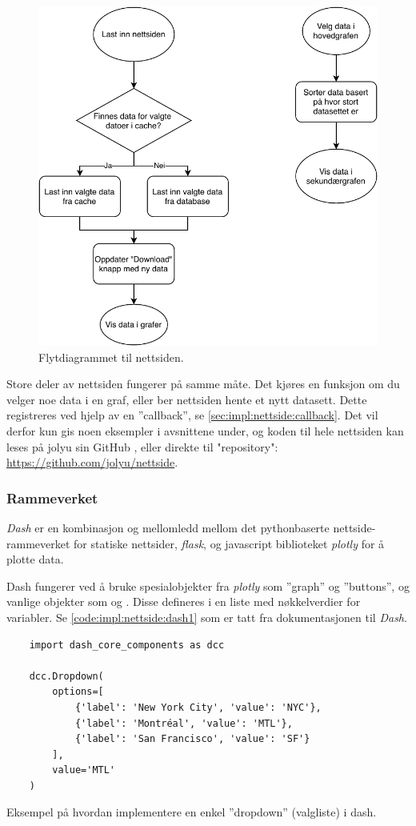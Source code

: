 \begin{figure}[!htbp]
    \centering
    \includegraphics[width=.7\textwidth]{implementering/nettside/JolyuNettsideOverordnetFlyt.pdf}
    \caption{Flytdiagrammet til nettsiden.}
    \label{fig:nettside:flytdiagram}
\end{figure}

Store deler av nettsiden fungerer på samme måte. 
Det kjøres en funksjon om du velger noe data i en graf, eller ber nettsiden hente et nytt datasett. 
Dette registreres ved hjelp av en ''callback'', se \autoref{sec:impl:nettside:callback}.
Det vil derfor kun gis noen eksempler i avsnittene under, og koden til hele nettsiden kan leses på jolyu sin GitHub \cite{GitHub}, eller direkte til "repository": \url{https://github.com/jolyu/nettside}.

\subsubsection{Rammeverket}\label{sec:impl:nettside:rammeverk}

\textit{Dash} \cite{dash} er en kombinasjon og mellomledd mellom det pythonbaserte nettside-rammeverket for statiske nettsider, \textit{flask}, \cite{flask} og javascript biblioteket \textit{plotly} \cite{plotly} for å plotte data.

Dash fungerer ved å bruke spesialobjekter fra \textit{plotly} som ''graph'' og ''buttons'', og vanlige  objekter som  og . 
Disse defineres i en liste med nøkkelverdier for variabler. Se \autoref{code:impl:nettside:dash1} som er tatt fra dokumentasjonen til \textit{Dash}. 

\begin{listing}[!htb]
\begin{verbatim}
    import dash_core_components as dcc

    dcc.Dropdown(
        options=[
            {'label': 'New York City', 'value': 'NYC'},
            {'label': 'Montréal', 'value': 'MTL'},
            {'label': 'San Francisco', 'value': 'SF'}
        ],
        value='MTL'
    )
\end{verbatim}
\caption{Eksempel på hvordan implementere en enkel ''dropdown'' (valgliste) i dash.}
\label{code:impl:nettside:dash1}
\end{listing}

